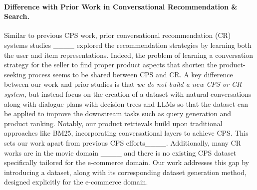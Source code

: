 \paragraph{Difference with Prior Work in Conversational Recommendation \& Search.}
Similar to previous CPS work, prior conversational recommendation (CR) systems studies ____ explored the recommendation strategies by learning both the user and item representations. Indeed, the problem of learning a conversation strategy for the seller to find proper product aspects that shorten the product-seeking process seems to be shared between CPS and CR.
A key difference between our work and prior studies is that \textit{we do not build a new CPS or CR system}, but instead focus on the creation of a dataset with natural conversations along with dialogue plans with decision trees and LLMs so that the dataset can be applied to improve the downstream tasks such as query generation and product ranking. Notably, our product retrievals build upon traditional approaches like BM25, incorporating conversational layers to achieve CPS. This sets our work apart from previous CPS efforts____. Additionally, many CR works are in the movie domain ____ and there is no existing CPS dataset specifically tailored for the e-commerce domain. Our work addresses this gap by introducing a dataset, along with its corresponding dataset generation method, designed explicitly for the e-commerce domain.
